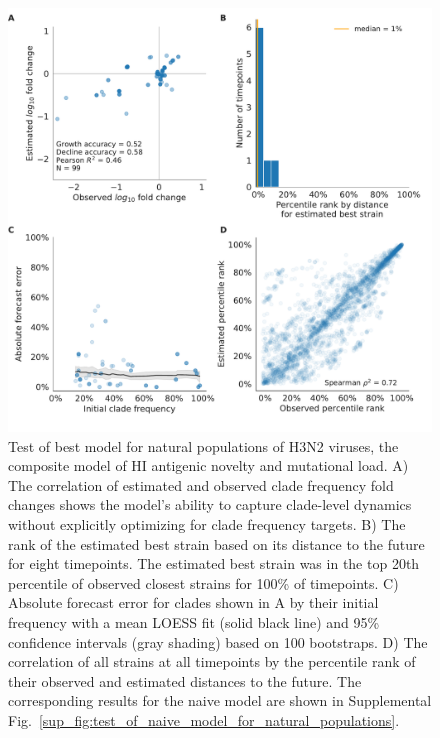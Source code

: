 \begin{figure}[p]
  \begin{center}
  \includegraphics[width=\textwidth]{figures/validation_figure_natural-natural_sample_1_with_90_vpm_sliding_test_tree-cTiter_x-ne_star.pdf}
  \caption{
  Test of best model for natural populations of H3N2 viruses, the composite model of HI antigenic novelty and mutational load.
  A) The correlation of estimated and observed clade frequency fold changes shows the model's ability to capture clade-level dynamics without explicitly optimizing for clade frequency targets.
  B) The rank of the estimated best strain based on its distance to the future for eight timepoints.
  The estimated best strain was in the top 20th percentile of observed closest strains for 100\% of timepoints.
  C) Absolute forecast error for clades shown in A by their initial frequency with a mean LOESS fit (solid black line) and 95\% confidence intervals (gray shading) based on 100 bootstraps.
  D) The correlation of all strains at all timepoints by the percentile rank of their observed and estimated distances to the future.
  The corresponding results for the naive model are shown in Supplemental Fig.~\ref{sup_fig:test_of_naive_model_for_natural_populations}.
  }
  \label{fig:test_of_best_model_for_natural_populations}
  \end{center}
\end{figure}

